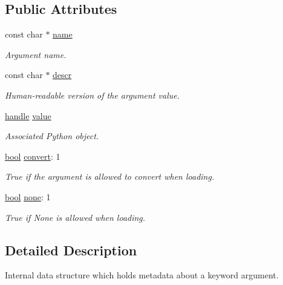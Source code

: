 \subsection*{Public Attributes}
\begin{DoxyCompactItemize}
\item 
const char $\ast$ \mbox{\hyperlink{structargument__record_ac9bb5bf320b8eb1de1ef5f9dcc808269}{name}}
\begin{DoxyCompactList}\small\item\em Argument name. \end{DoxyCompactList}\item 
const char $\ast$ \mbox{\hyperlink{structargument__record_a5bee7fa9c31dc8e5e1b9406cb483e610}{descr}}
\begin{DoxyCompactList}\small\item\em Human-\/readable version of the argument value. \end{DoxyCompactList}\item 
\mbox{\hyperlink{classhandle}{handle}} \mbox{\hyperlink{structargument__record_a3d6ba6a0cb59834720cb7d7df5bdb2c2}{value}}
\begin{DoxyCompactList}\small\item\em Associated Python object. \end{DoxyCompactList}\item 
\mbox{\hyperlink{asdl_8h_af6a258d8f3ee5206d682d799316314b1}{bool}} \mbox{\hyperlink{structargument__record_ab885e9c26fb95309b6f3f03410f36d30}{convert}}\+: 1
\begin{DoxyCompactList}\small\item\em True if the argument is allowed to convert when loading. \end{DoxyCompactList}\item 
\mbox{\hyperlink{asdl_8h_af6a258d8f3ee5206d682d799316314b1}{bool}} \mbox{\hyperlink{structargument__record_a62c9d868218688cd4abde4634646848c}{none}}\+: 1
\begin{DoxyCompactList}\small\item\em True if None is allowed when loading. \end{DoxyCompactList}\end{DoxyCompactItemize}


\subsection{Detailed Description}
Internal data structure which holds metadata about a keyword argument. 

